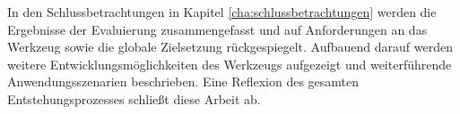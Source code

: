 In den Schlussbetrachtungen in Kapitel \ref{cha:schlussbetrachtungen} werden die Ergebnisse der Evaluierung zusammengefasst und auf Anforderungen an das Werkzeug sowie die globale Zielsetzung rückgespiegelt. Aufbauend darauf werden weitere Entwicklungsmöglichkeiten des Werkzeugs aufgezeigt und weiterführende Anwendungsszenarien beschrieben. Eine Reflexion des gesamten Entstehungsprozesses schließt diese Arbeit ab.


